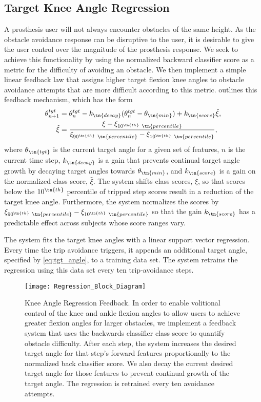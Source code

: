 \subsection{Target Knee Angle Regression}

A prosthesis user will not always encounter obstacles of the same height. As the
obstacle avoidance response can be disruptive to the user, it is desirable to
give the user control over the magnitude of the prosthesis response. We seek to
achieve this functionality by using the normalized backward classifier score as
a metric for the difficulty of avoiding an obstacle. We then implement a simple
linear feedback law that assigns higher target flexion knee angles to obstacle
avoidance attempts that are more difficult according to this metric.
 outlines this feedback mechanism, which has the form
\begin{align}
    \theta_{n+1}^{tgt} &= \theta_{n}^{tgt} - k_\tn{decay}(\theta_{n}^{tgt} 
        - \theta_\tn{min})     + k_\tn{score} \hat{\xi},\label{eq:tgt_angle}\\
    \hat{\xi} &= \frac{\xi - \xi_{10^\tn{th} \ \tn{percentile}}}{
        \xi_{90^\tn{th} \ \tn{percentile}} - \xi_{10^\tn{th} \ \tn{percentile}}},
        \label{eq:score_norm}
\end{align}
where $\theta_\tn{tgt}$ is the current target angle for a given set of features,
$n$ is the current time step, $k_\tn{decay}$ is a gain that prevents continual
target angle growth by decaying target angles towards $\theta_\tn{min}$, and
$k_\tn{score}$ is a gain on the normalized class score, $\hat{\xi}$. The system
shifts class scores, $\xi$, so that scores below the $10^\tn{th}$ percentile of
tripped step scores result in a reduction of the target knee angle. Furthermore,
the system normalizes the scores by $\xi_{90^\tn{th} \ \tn{percentile}} -
\xi_{10^\tn{th} \ \tn{percentile}}$ so that the gain $k_\tn{score}$ has a
predictable effect across subjects whose score ranges vary. 

The system fits the target knee angles with a linear support vector regression.
Every time the trip avoidance triggers, it appends an additional target angle,
specified by \cref{eq:tgt_angle}, to a training data set. The system retrains
the regression using this data set every ten trip-avoidance steps.

\begin{figure}[tb]
    \centerline{\texttt{[image: Regression\_Block\_Diagram]}}
    \caption[Knee Angle Regression Feedback]{Knee Angle Regression Feedback. In
    order to enable volitional control of the knee and ankle flexion angles to
    allow users to achieve greater flexion angles for larger obstacles, we
    implement a feedback system that uses the backwards classifier class score
    to quantify obstacle difficulty. After each step, the system increases the
    desired target angle for that step's forward features proportionally to the
    normalized back classifier score. We also decay the current desired target
    angle for those features to prevent continual growth of the target angle.
    The regression is retrained every ten avoidance
    attempts.}\label{fig:knee_reg}
\end{figure}


